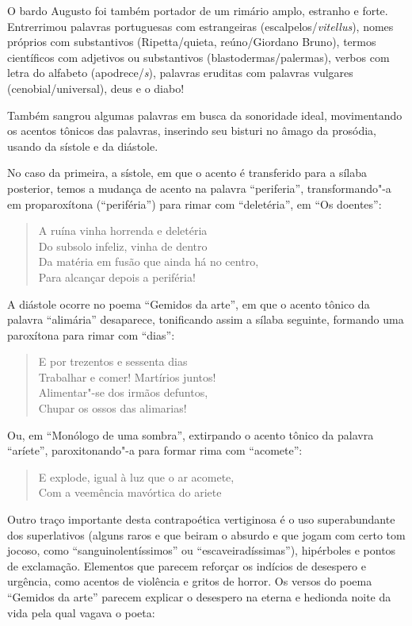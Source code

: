 O bardo Augusto foi também portador de um rimário amplo, estranho e
forte. Entrerrimou palavras portuguesas com estrangeiras
(escalpelos/\textit{vitellus}), nomes próprios com substantivos
(Ripetta/quieta, reúno/Giordano Bruno), termos científicos com
adjetivos ou substantivos (blastodermas/palermas), verbos com letra do
alfabeto (apodrece/\textit{s}), palavras eruditas com palavras vulgares
(cenobial/universal), deus e o diabo! 

Também sangrou algumas palavras em busca da sonoridade ideal,
movimentando os acentos tônicos das palavras, inserindo seu bisturi no
âmago da prosódia, usando da sístole e da diástole. 

No caso da primeira, a sístole, em que o acento é transferido para a
sílaba posterior, temos a mudança de acento na palavra “periferia”,
transformando"-a em proparoxítona (“periféria”) para rimar com
“deletéria”, em “Os doentes”:

\begin{verse}
A ruína vinha horrenda e deletéria\\
Do subsolo infeliz, vinha de dentro\\
Da matéria em fusão que ainda há no centro,\\
Para alcançar depois a periféria!
\end{verse}

A diástole ocorre no poema “Gemidos da arte”, em que o acento tônico
da palavra “alimária” desaparece, tonificando assim a sílaba seguinte,
formando uma paroxítona para rimar com “dias”:

\begin{verse}
E por trezentos e sessenta dias\\
Trabalhar e comer! Martírios juntos!\\
Alimentar"-se dos irmãos defuntos,\\
Chupar os ossos das alimarias!
\end{verse}

Ou, em “Monólogo de uma sombra”, extirpando o acento tônico da
palavra “aríete”, paroxitonando"-a para formar rima com
“acomete”:

\begin{verse}
E explode, igual à luz que o ar acomete,\\
Com a veemência mavórtica do ariete
\end{verse}

Outro traço importante desta contrapoética vertiginosa é o uso
superabundante dos superlativos (alguns raros e que beiram o absurdo e
que jogam com certo tom jocoso, como “sanguinolentíssimos” ou
“escaveiradíssimas”), hipérboles e pontos de exclamação. Elementos que
parecem reforçar os indícios de desespero e urgência, como acentos de
violência e gritos de horror. Os versos do poema “Gemidos da arte”
parecem explicar o desespero na eterna e hedionda noite da vida pela
qual vagava o poeta:

